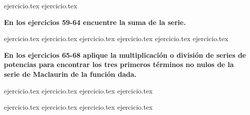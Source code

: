 \vspace{0.3cm}
\begin{enumerate}
    \setcounter{enumi}{56}
    {ejercicio.tex}
{ejercicio.tex}
\end{enumerate}

\vspace{0.3cm}
\noindent\textbf{En los ejercicios 59-64 encuentre la suma de la serie.}
\begin{enumerate}
    \setcounter{enumi}{58}
    {ejercicio.tex}
{ejercicio.tex}
{ejercicio.tex}
{ejercicio.tex}
{ejercicio.tex}
{ejercicio.tex}
\end{enumerate}

\vspace{0.3cm}
\noindent\textbf{En los ejercicios 65-68 aplique la multiplicación o división de series de potencias para encontrar los tres primeros términos no nulos de la serie de Maclaurin de la función dada.}
\begin{enumerate}
    \setcounter{enumi}{64}
    {ejercicio.tex}
{ejercicio.tex}
{ejercicio.tex}
{ejercicio.tex}
\end{enumerate}

\vspace{0.3cm}
\begin{enumerate}
    \setcounter{enumi}{68}
    {ejercicio.tex}
{ejercicio.tex}
{ejercicio.tex}
{ejercicio.tex}
\end{enumerate}
